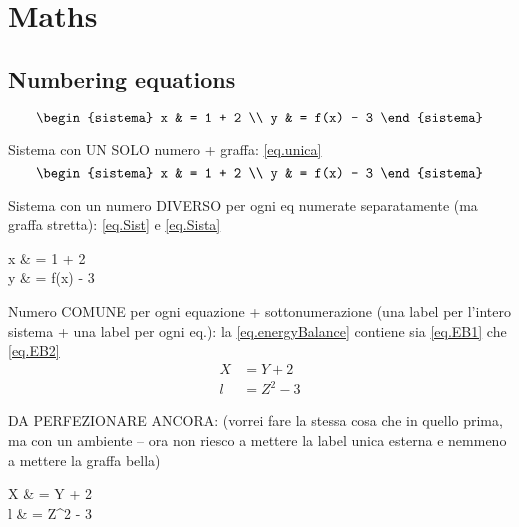 
\section{Maths}
\subsection{Numbering equations}
\[
\begin{sistema}
	x & = 1 + 2 \\
	y & = f(x) - 3
\end{sistema}
\]

Sistema con UN SOLO numero + graffa: \cref{eq.unica}
\begin{equation}\label{eq.unica}
\begin{sistema}
	x & = 1 + 2  \\
	y & = f(x) - 3
\end{sistema}
\end{equation}

Sistema con un numero DIVERSO per ogni eq numerate separatamente (ma graffa stretta): \cref{eq.Sist} e \cref{eq.Sista}
\begin{sistemaSub}
		x & = 1 + 2 \label{eq.Sist} \\
		y & = f(x) - 3 \label{eq.Sista}
\end{sistemaSub}

Numero COMUNE per ogni equazione + sottonumerazione (una label per l'intero sistema + una label per ogni eq.): la \cref{eq.energyBalance} contiene sia \cref{eq.EB1} che \cref{eq.EB2}
\begin{subequations}\label{eq.energyBalance}
	\begin{align}
		X 	& = Y + 2 \label{eq.EB1} \\ 
		l & = Z^2 - 3 \label{eq.EB2}
	\end{align}
\end{subequations}

{\color{red} DA PERFEZIONARE ANCORA: (vorrei fare la stessa cosa che in quello prima, ma con un ambiente -- ora non riesco a mettere la label unica esterna e nemmeno a mettere la graffa bella)
\begin{sistemaX}
			X 	& = Y + 2 \label{eq.EB3} \\ 
	l & = Z^2 - 3 \label{eq.EB4}
\end{sistemaX}
}

